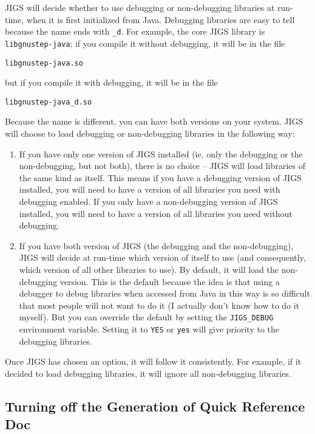 JIGS will decide whether to use debugging or non-debugging libraries
at run-time, when it is first initialized from Java.  Debugging
libraries are easy to tell because the name ends with \texttt{\_d}.
For example, the core JIGS library is
\texttt{libgnustep-java}; if you compile it without debugging, it will 
be in the file 
\begin{verbatim}
libgnustep-java.so
\end{verbatim}
but if you compile it with debugging, it will be in the file 
\begin{verbatim}
libgnustep-java_d.so
\end{verbatim}
Because the name is different, you can have both versions on your
system.  JIGS will choose to load debugging or non-debugging libraries
in the following way:
\begin{enumerate}
\item If you have only one version of JIGS installed (ie, only the debugging 
or the non-debugging, but not both), there is no choice -- JIGS will
load libraries of the same kind as itself.  This means if you have a
debugging version of JIGS installed, you will need to have a version
of all libraries you need with debugging enabled.  If you only have a
non-debugging version of JIGS installed, you will need to have a
version of all libraries you need without debugging.
\item If you have both version of JIGS (the debugging and the non-debugging), 
JIGS will decide at run-time which version of itself to use (and
consequently, which version of all other libraries to use).  By
default, it will load the non-debugging version.  This is the default
because the idea is that using a debugger to debug libraries when
accessed from Java in this way is so difficult that most people will
not want to do it (I actually don't know how to do it myself).  But
you can override the default by setting the \texttt{JIGS\_DEBUG}
environment variable.  Setting it to \texttt{YES} or \texttt{yes} will
give priority to the debugging libraries.
\end{enumerate}
Once JIGS has chosen an option, it will follow it consistently.  For
example, if it decided to load debugging libraries, it will ignore all
non-debugging libraries.

\subsection{Turning off the Generation of Quick Reference Doc}

